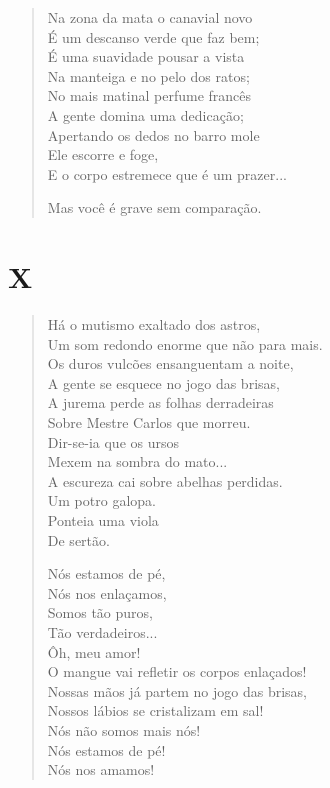 \begin{verse}
Na zona da mata o canavial novo\\
É um descanso verde que faz bem;\\
É uma suavidade pousar a vista\\
Na manteiga e no pelo dos ratos;\\
No mais matinal perfume francês\\
A gente domina uma dedicação;\\
Apertando os dedos no barro mole\\
Ele escorre e foge,\\
E o corpo estremece que é um prazer...

Mas você é grave sem comparação.
\end{verse}

\pagebreak
\section{X}

\begin{verse}
Há o mutismo exaltado dos astros,\\
Um som redondo enorme que não para mais.\\
Os duros vulcões ensanguentam a noite,\\
A gente se esquece no jogo das brisas,\\
A jurema perde as folhas derradeiras\\
Sobre Mestre Carlos que morreu.\\
Dir-se-ia que os ursos\\
Mexem na sombra do mato...\\
A escureza cai sobre abelhas perdidas.\\
Um potro galopa.\\
Ponteia uma viola\\
De sertão.

Nós estamos de pé,\\
Nós nos enlaçamos,\\
Somos tão puros,\\
Tão verdadeiros...\\
Ôh, meu amor!\\
O mangue vai refletir os corpos enlaçados!\\
Nossas mãos já partem no jogo das brisas,\\
Nossos lábios se cristalizam em sal!\\
Nós não somos mais nós!\\
Nós estamos de pé!\\
Nós nos amamos!
\end{verse}


